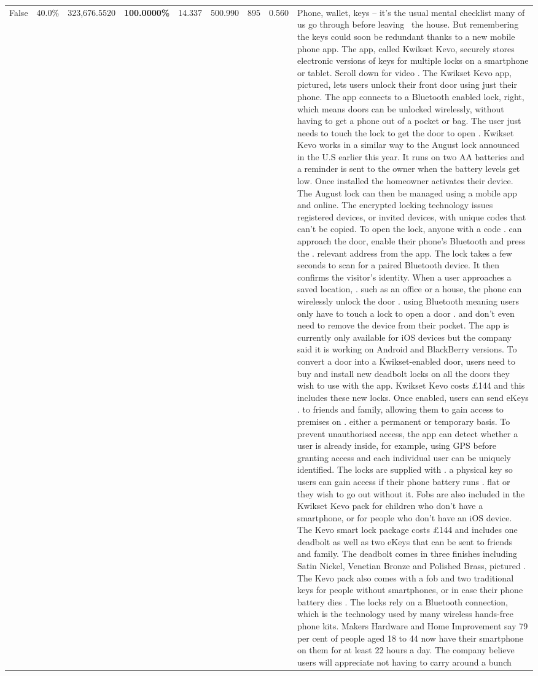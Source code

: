 \begin{table}[H]
\begin{tabular}{lllrlllll}
False & 40.0\% & 323,676.5520 & \bfseries \color{red} 100.0000\% & 14.337 & 500.990 & 895 & 0.560 & Phone, wallet, keys – it’s the usual mental checklist many of us go through before leaving  the house. But remembering the keys could soon be redundant thanks to a new mobile phone app. The app, called Kwikset Kevo, securely stores electronic versions of keys for multiple locks on a smartphone or tablet. Scroll down for video . The Kwikset Kevo app, pictured, lets users unlock their front door using just their phone. The app connects to a Bluetooth enabled lock, right, which means doors can be unlocked wirelessly, without having to get a phone out of a pocket or bag. The user just needs to touch the lock to get the door to open . Kwikset Kevo works in a similar way to the August lock announced in the U.S earlier this year. It runs on two AA batteries and a reminder is sent to the owner when the battery levels get low. Once installed the homeowner activates their device. The August lock can then be managed using a mobile app and online. The encrypted locking technology issues registered devices, or invited devices, with unique codes that can't be copied. To open the lock, anyone with a code . can approach the door, enable their phone's Bluetooth and press the . relevant address from the app. The lock takes a few seconds to scan for a paired Bluetooth device. It then confirms the visitor's identity. When a user approaches a saved location, . such as an office or a house, the phone can wirelessly unlock the door . using Bluetooth meaning users only have to touch a lock to open a door . and don't even need to remove the device from their pocket. The app is currently only available for iOS devices but the company said it is working on Android and BlackBerry versions. To convert a door into a Kwikset-enabled door, users need to buy and install new deadbolt locks on all the doors they wish to use with the app. Kwikset Kevo costs £144 and this includes these new locks. Once enabled, users can send eKeys . to friends and family, allowing them to gain access to premises on . either a permanent or temporary basis. To prevent unauthorised access, the app can detect whether a user is already inside, for example, using GPS before granting access and each individual user can be uniquely identified. The locks are supplied with . a physical key so users can gain access if their phone battery runs . flat or they wish to go out without it. Fobs are also included in the Kwikset Kevo pack for children who don't have a smartphone, or for people who don't have an iOS device. The Kevo smart lock package costs £144 and includes one deadbolt as well as two eKeys that can be sent to friends and family. The deadbolt comes in three finishes including Satin Nickel, Venetian Bronze and Polished Brass, pictured . The Kevo pack also comes with a fob and two traditional keys for people without smartphones, or in case their phone battery dies . The locks rely on a Bluetooth connection, which is the technology used by many wireless hands-free phone kits. Makers Hardware and Home Improvement say 79 per cent of people aged 18 to 44 now have their smartphone on them for at least 22 hours a day. The company believe users will appreciate not having to carry around a bunch 
\end{tabular}
\end{table}
